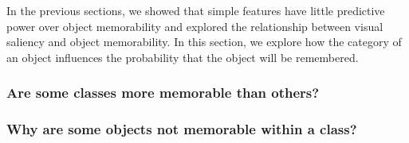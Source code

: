 In the previous sections, we showed that simple features have little predictive power over object memorability and explored the relationship between visual saliency and object memorability. In this section, we explore how the category of an object influences the probability that the object will be remembered. 

\subsubsection{Are some classes more memorable than others?}



\subsubsection{Why are some objects not memorable within a class?}



